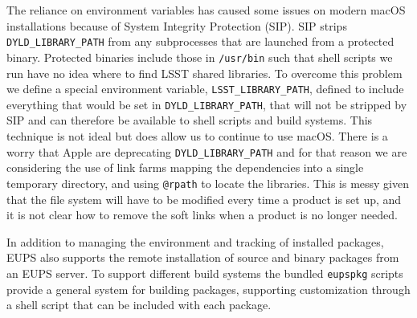 The reliance on environment variables has caused some issues on modern macOS installations because of System Integrity Protection (SIP).\cite{DMTN-001}
SIP strips \texttt{DYLD\_LIBRARY\_PATH} from any subprocesses that are launched from a protected binary.
Protected binaries include those in \texttt{/usr/bin} such that shell scripts we run have no idea where to find LSST shared libraries.
To overcome this problem we define a special environment variable, \texttt{LSST\_LIBRARY\_PATH}, defined to include everything that would be set in \texttt{DYLD\_LIBRARY\_PATH}, that will not be stripped by SIP and can therefore be available to shell scripts and build systems.
This technique is not ideal but does allow us to continue to use macOS.
There is a worry that Apple are deprecating \texttt{DYLD\_LIBRARY\_PATH} and for that reason we are considering the use of link farms mapping the dependencies into a single temporary directory, and using \texttt{@rpath} to locate the libraries.
This is messy given that the file system will have to be modified every time a product is set up, and it is not clear how to remove the soft links when a product is no longer needed.

In addition to managing the environment and tracking of installed packages, EUPS also supports the remote installation of source and binary packages from an EUPS server.
To support different build systems the bundled \texttt{eupspkg} scripts provide a general system for building packages, supporting customization through a shell script that can be included with each package.
